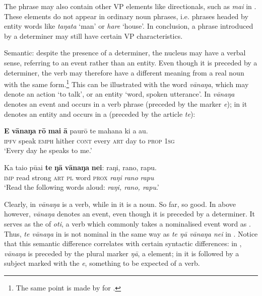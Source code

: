 The phrase may also contain other VP elements like directionals, such as \textit{mai} in . These elements do not appear in ordinary noun phrases, i.e. phrases headed by entity words like \textit{taŋata} ‘man’ or \textit{hare} ‘house’. In conclusion, a phrase introduced by a determiner may still have certain VP characteristics.

Semantic: despite the presence of a determiner, the nucleus may have a verbal sense, referring to an event rather than an entity. Even though it is preceded by a determiner, the verb may therefore have a different meaning from a real noun with the same form.\footnote{\label{fn:94}The same point is made by \citet[511]{Besnier2000} for .} This can be illustrated with the word \textit{vānaŋa}, which may denote an action ‘to talk’, or an entity ‘word, spoken utterance’. In  \textit{vānaŋa} denotes an event and occurs in a verb phrase (preceded by the  marker \textit{e}); in  it denotes an entity and occurs in a  (preceded by the article \textit{te}):

\ea\label{ex:3.9}
\gll \textbf{E} \textbf{vānaŋa} \textbf{rō} \textbf{mai} \textbf{{\ꞌ}ā} paurō te mahana ki a au.\\
\textsc{ipfv} speak \textsc{emph} hither \textsc{cont} every \textsc{art} day to \textsc{prop} \textsc{1sg}\\

\glt 
‘Every day he speaks to me.’ \textstyleExampleref{[R655.018]} 
\z

\ea\label{ex:3.10}
\gll Ka tai{\ꞌ}o pūai \textbf{te} \textbf{ŋā} \textbf{vānaŋa} \textbf{nei}: raŋi, rano, rapu.\\
\textsc{imp} read strong \textsc{art} \textsc{pl} word \textsc{prox} \textit{raŋi} \textit{rano} \textit{rapu}\\

\glt
‘Read the following words aloud: \textit{raŋi, rano, rapu}.’ \textstyleExampleref{[R616.147]} 
\z

Clearly, in  \textit{vānaŋa} is a verb, while in  it is a noun. So far, so good. In  above however, \textit{vānaŋa} denotes an event, even though it is preceded by a determiner. It serves as the  of \textit{oti}, a verb which commonly takes a nominalised event word as . Thus, \textit{te vānaŋa} in  is not nominal in the same way as \textit{te ŋā vānaŋa nei} in . Notice that this semantic difference correlates with certain syntactic differences: in , \textit{vānaŋa} is preceded by the plural marker \textit{ŋā}, a  element; in  it is followed by a subject marked with the  \textit{e}, something to be expected of a verb. 


